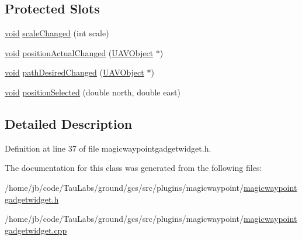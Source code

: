 \subsection*{\-Protected \-Slots}
\begin{DoxyCompactItemize}
\item 
\hyperlink{group___u_a_v_objects_plugin_ga444cf2ff3f0ecbe028adce838d373f5c}{void} \hyperlink{group___g_c_s_control_gadget_plugin_ga9cebbe1d3a653c8385f5fdc70345efd6}{scale\-Changed} (int scale)
\item 
\hyperlink{group___u_a_v_objects_plugin_ga444cf2ff3f0ecbe028adce838d373f5c}{void} \hyperlink{group___g_c_s_control_gadget_plugin_gaa10cdac61400db1034c7954b3c549824}{position\-Actual\-Changed} (\hyperlink{class_u_a_v_object}{\-U\-A\-V\-Object} $\ast$)
\item 
\hyperlink{group___u_a_v_objects_plugin_ga444cf2ff3f0ecbe028adce838d373f5c}{void} \hyperlink{group___g_c_s_control_gadget_plugin_ga3270e904f313cabdad8a5048009ceb25}{path\-Desired\-Changed} (\hyperlink{class_u_a_v_object}{\-U\-A\-V\-Object} $\ast$)
\item 
\hyperlink{group___u_a_v_objects_plugin_ga444cf2ff3f0ecbe028adce838d373f5c}{void} \hyperlink{group___g_c_s_control_gadget_plugin_ga8735baaf13101dbe0dafb3dc84d83efd}{position\-Selected} (double north, double east)
\end{DoxyCompactItemize}


\subsection{\-Detailed \-Description}


\-Definition at line 37 of file magicwaypointgadgetwidget.\-h.



\-The documentation for this class was generated from the following files\-:\begin{DoxyCompactItemize}
\item 
/home/jb/code/\-Tau\-Labs/ground/gcs/src/plugins/magicwaypoint/\hyperlink{magicwaypointgadgetwidget_8h}{magicwaypointgadgetwidget.\-h}\item 
/home/jb/code/\-Tau\-Labs/ground/gcs/src/plugins/magicwaypoint/\hyperlink{magicwaypointgadgetwidget_8cpp}{magicwaypointgadgetwidget.\-cpp}\end{DoxyCompactItemize}
